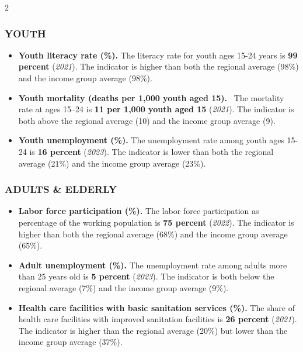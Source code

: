 \documentclass[
  9pt,
]{article}
\begin{document}
\begin {multicols}{2}
\hypertarget{section-5}{%
\subsubsection{\texorpdfstring{\textcolor{bondiblue}{\textbf{Y\small{OUTH}}}}{}}\label{section-5}}

\begin{itemize}
\item
  \textbf{Youth literacy rate (\%).} The literacy rate for youth ages
  15-24 years is \textbf{99 percent} (\emph{2021}). The indicator is
  higher than both the regional average (98\%) and the income group
  average (98\%).
\item
  \textbf{Youth mortality (deaths per 1,000 youth aged 15).} ~The
  mortality rate at ages 15--24 is \textbf{11 per 1,000 youth aged 15}
  (\emph{2021}). The indicator is both above the regional average (10)
  and the income group average (9).
\item
  \textbf{Youth unemployment (\%).} The unemployment rate among youth
  ages 15-24 is \textbf{16 percent} (\emph{2023}). The indicator is
  lower than both the regional average (21\%) and the income group
  average (23\%).
\end{itemize}

\hypertarget{section-6}{%
\subsubsection{\texorpdfstring{\textcolor{bondiblue}{\textbf{A\small{DULTS \& ELDERLY}}}}{}}\label{section-6}}

\begin{itemize}
\item
  \textbf{Labor force participation (\%).} The labor force participation
  as percentage of the working population is \textbf{75 percent}
  (\emph{2022}). The indicator is higher than both the regional average
  (68\%) and the income group average (65\%).
\item
  \textbf{Adult unemployment (\%).} The unemployment rate among adults
  more than 25 years old is \textbf{5 percent} (\emph{2023}). The
  indicator is both below the regional average (7\%) and the income
  group average (9\%).
\item
  \textbf{Health care facilities with basic sanitation services (\%).}
  The share of health care facilities with improved sanitation
  facilities is \textbf{26 percent} (\emph{2021}). The indicator is
  higher than the regional average (20\%) but lower than the income
  group average (37\%).
\end{itemize}


\end{multicols}
\end{document}

